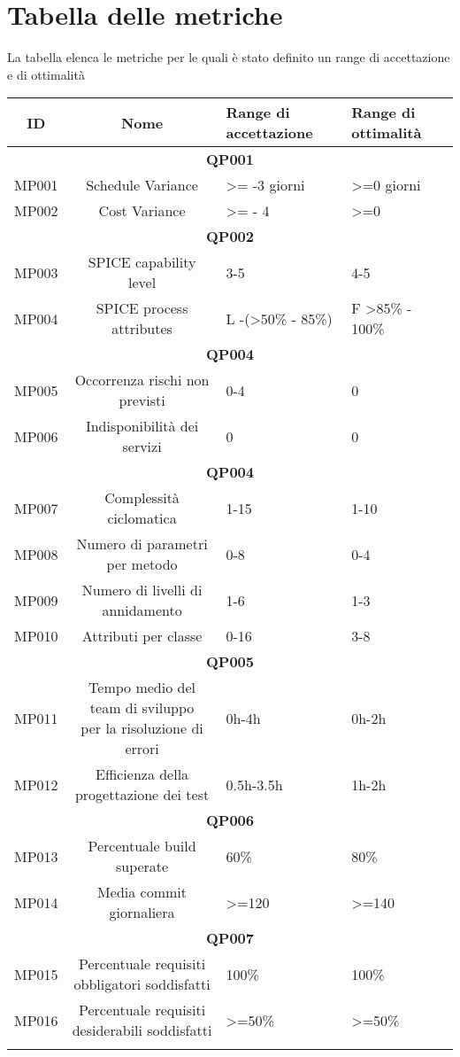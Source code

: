 \section{Tabella delle metriche}
\label{Tab2.2}
La tabella elenca le metriche per le quali è stato definito un range di accettazione e di ottimalità
\begin{tabularx}{\textwidth}{|c|c|X|X|}
	\hline 
	\textbf{ID} & \textbf{Nome} & \textbf{Range di accettazione}  & \textbf{Range di ottimalità}  \\ 
	\hline
	\multicolumn{4}{|c|}{\textbf{QP001}} \\
	\hline
	MP001 & Schedule Variance & >= -3 giorni & >=0 giorni \\ 
	\hline
	MP002 &Cost Variance& >= - 4 &  >=0 \\ 
	\hline
	\multicolumn{4}{|c|}{\textbf{QP002}} \\
	\hline
	MP003 & SPICE capability level & 3-5 & 4-5 \\ 
	\hline 
	MP004 & SPICE process attributes & L -(>50\% - 85\%)  & F >85\% - 100\% \\ 
	\hline
	\multicolumn{4}{|c|}{\textbf{QP004}} \\
	\hline 
	MP005 & Occorrenza rischi non previsti &   0-4 &0 \\
	\hline 
	MP006 & Indisponibilità dei servizi & 0   & 0 \\
	\hline
	\multicolumn{4}{|c|}{\textbf{QP004}} \\
	\hline
	MP007 & Complessità ciclomatica & 1-15 & 1-10 \\ 
	\hline 
	MP008 & Numero di parametri per metodo & 0-8 & 0-4 \\ 
	\hline 
	MP009& Numero di livelli di annidamento & 1-6 & 1-3 \\ 
	\hline 
	MP010 & Attributi per classe & 0-16 & 3-8 \\ 
	\hline 
	\multicolumn{4}{|c|}{\textbf{QP005}} \\
	\hline
	MP011 &\makecell{Tempo medio del team di sviluppo \\ per la risoluzione di errori} & 0h-4h & 0h-2h \\ 
	\hline 
	MP012 & Efficienza della progettazione dei test  & 0.5h-3.5h  & 1h-2h \\ 
	\hline 
	\multicolumn{4}{|c|}{\textbf{QP006}} \\
	\hline
	MP013 & Percentuale build superate& 60\% & 80\%\\
	\hline
	MP014 & Media commit giornaliera & >=120 & >=140\\
	\hline
	\multicolumn{4}{|c|}{\textbf{QP007}} \\
	\hline
	MP015& \makecell{Percentuale requisiti \\ obbligatori soddisfatti}& 100\% & 100\%  \\
	\hline
	MP016& \makecell{Percentuale requisiti \\ desiderabili soddisfatti}& >=50\% &>=50\% \\
	\hline
	\caption{Tabella delle metriche dei processi}
\end{tabularx}